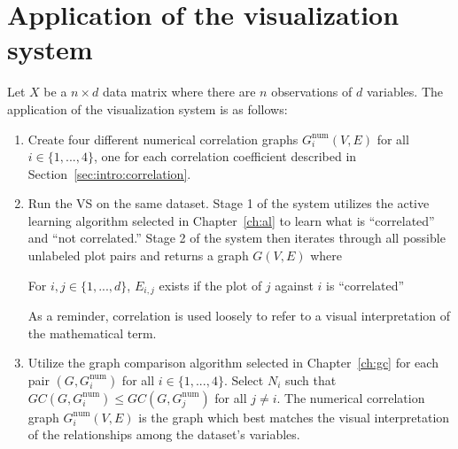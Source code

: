 \section{Application of the visualization system}
\label{sec:usage:newanalysis}

Let $X$ be a $n\times d$ data matrix where there are $n$ observations of $d$ 
variables. The application of the visualization system is as follows:

\tablespacing
\begin{enumerate}
	\item Create four different numerical correlation graphs 
	$G_i^{\text{num}}(V,E)$ for all $i\in \{1,...,4\}$, one for each 
	correlation coefficient described in Section~\ref{sec:intro:correlation}.
	\item Run the VS on the same dataset. Stage 1 of the system utilizes the 
	active learning algorithm selected in Chapter~\ref{ch:al} to learn what is 
	``correlated'' and ``not correlated.'' Stage 2 of the system then iterates 
	through all possible unlabeled plot pairs and returns a graph $G(V,E)$ 
	where 

\begin{algorithm}
	For $i,j\in \{1,...,d\}$, $E_{i,j}$ exists if the plot of $j$ against $i$ 
	is ``correlated''
\end{algorithm}

	As a reminder, correlation is used loosely to refer to a visual 
	interpretation of the mathematical term.

	\item Utilize the graph comparison algorithm selected in 
	Chapter~\ref{ch:gc} for each pair $(G,G_i^{\text{num}})$ for all $i \in 
	\{1,...,4\}$. 
	Select $N_i$ such that $GC(G,G_i^{\text{num}}) \leq GC(G,G_j^{\text{num}})$ 
	for all $j\neq i$. The 
	numerical correlation graph $G_i^{\text{num}}(V,E)$ is the graph which best 
	matches the visual interpretation of the relationships among the dataset's 
	variables.
\end{enumerate}
\bodyspacing